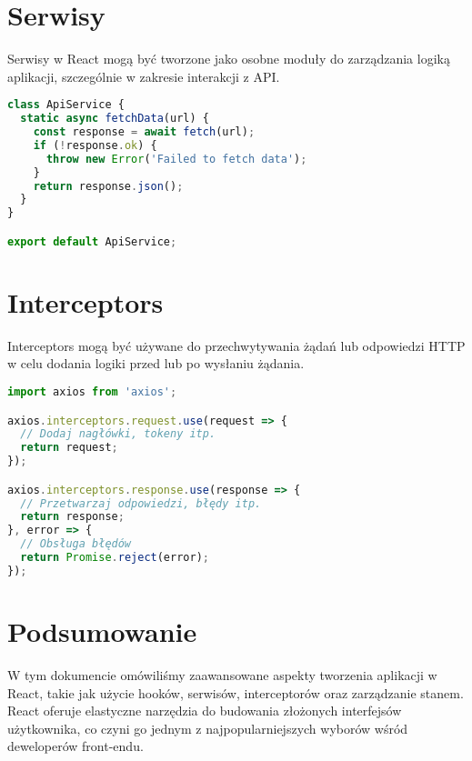 \documentclass[a4paper,12pt]{article}
\begin{document}
\section{Serwisy}
Serwisy w React mogą być tworzone jako osobne moduły do zarządzania logiką aplikacji, szczególnie w zakresie interakcji z API.

\begin{lstlisting}[language=JavaScript, caption=Przykład serwisu API]
class ApiService {
  static async fetchData(url) {
    const response = await fetch(url);
    if (!response.ok) {
      throw new Error('Failed to fetch data');
    }
    return response.json();
  }
}

export default ApiService;
\end{lstlisting}

\section{Interceptors}
Interceptors mogą być używane do przechwytywania żądań lub odpowiedzi HTTP w celu dodania logiki przed lub po wysłaniu żądania.

\begin{lstlisting}[language=JavaScript, caption=Przykład użycia Interceptorów w Axios]
import axios from 'axios';

axios.interceptors.request.use(request => {
  // Dodaj nagłówki, tokeny itp.
  return request;
});

axios.interceptors.response.use(response => {
  // Przetwarzaj odpowiedzi, błędy itp.
  return response;
}, error => {
  // Obsługa błędów
  return Promise.reject(error);
});
\end{lstlisting}

\section{Podsumowanie}
W tym dokumencie omówiliśmy zaawansowane aspekty tworzenia aplikacji w React, takie jak użycie hooków, serwisów, interceptorów oraz zarządzanie stanem. React oferuje elastyczne narzędzia do budowania złożonych interfejsów użytkownika, co czyni go jednym z najpopularniejszych wyborów wśród deweloperów front-endu.
\end{document}
